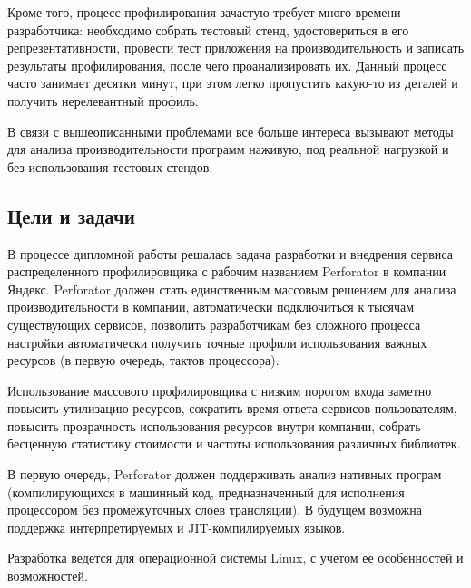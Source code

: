 Кроме того, процесс профилирования зачастую требует много времени разработчика: необходимо собрать тестовый стенд, удостовериться в его репрезентативности, провести тест приложения на производительность и записать результаты профилирования, после чего проанализировать их. Данный процесс часто занимает десятки минут, при этом легко пропустить какую-то из деталей и получить нерелевантный профиль.

В связи с вышеописанными проблемами все больше интереса вызывают методы для анализа производительности программ наживую, под реальной нагрузкой и без использования тестовых стендов.

\subsection{Цели и задачи}
В процессе дипломной работы решалась задача разработки и внедрения сервиса распределенного профилировщика с рабочим названием Perforator в компании Яндекс.
Perforator должен стать единственным массовым решением для анализа производительности в компании, автоматически подключиться к тысячам существующих сервисов, позволить разработчикам без сложного процесса настройки автоматически получить точные профили использования важных ресурсов (в первую очередь, тактов процессора).

Использование массового профилировщика с низким порогом входа заметно повысить утилизацию ресурсов, сократить время ответа сервисов пользователям, повысить прозрачность использования ресурсов внутри компании, собрать бесценную статистику стоимости и частоты использования различных библиотек.

В первую очередь, Perforator должен поддерживать анализ нативных програм (компилирующихся в машинный код, предназначенный для исполнения процессором без промежуточных слоев трансляции). В будущем возможна поддержка интерпретируемых и JIT-компилируемых языков.

Разработка ведется для операционной системы Linux, с учетом ее особенностей и возможностей.
